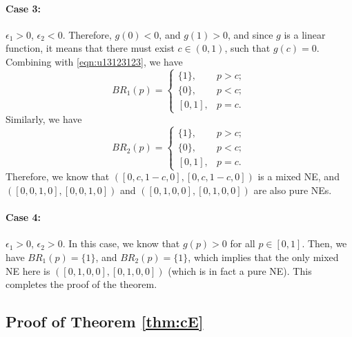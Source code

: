 \noindent \paragraph{Case 3:} $\epsilon_1>0$, $\epsilon_2<0$. Therefore, $g(0)<0$, and $g(1)>0$, and since $g$ is a linear function, it means that there must exist $c\in(0,1)$, such that $g(c)=0$. 
Combining with \eqref{eqn:u13123123}, we have 
\begin{equation*}
BR_1(p)= 
    \begin{cases}
        \{1\}, & p>c;\\
        \{0\},  & p<c;\\
        [0,1], & p=c.
    \end{cases}
\end{equation*}
Similarly, we have 
\begin{equation*}
BR_2(p)= 
    \begin{cases}
        \{1\}, & p>c;\\
        \{0\},  & p<c;\\
        [0,1], & p=c.
    \end{cases}
\end{equation*}
Therefore, we know that $([0,c,1-c,0],[0,c,1-c,0])$ is a mixed NE, and $([0,0,1,0],[0,0,1,0])$ and $([0,1,0,0],[0,1,0,0])$ are also pure NEs. 

\noindent \paragraph{Case 4:} $\epsilon_1>0$, $\epsilon_2>0$. In this case, we know that $g(p)>0$ for all $p\in[0,1]$. Then, we have $BR_1(p)=\{1\}$, and $BR_2(p)=\{1\}$, which implies that the only mixed NE here is $([0,1,0,0], [0,1,0,0])$ (which is in fact a pure NE).
This completes the proof of the theorem.

\subsection{Proof of Theorem \ref{thm:cE}}
\label{proof:CE}

